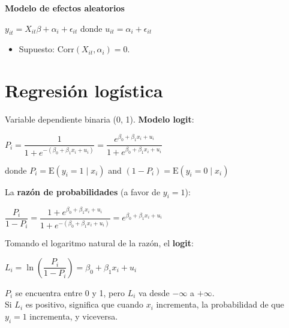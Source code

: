 \documentclass[10pt, a4paper, landscape]{article}
\newcommand{\E}{\mathrm{E}}
\newcommand{\Corr}{\mathrm{Corr}}
\begin{document}
\begin{multicols}{3}
		\textbf{Modelo de efectos aleatorios}
		
		\begin{center}
			$y_{it} = X_{it} \beta + \alpha_{i} + \epsilon_{it}$ donde $u_{it} = \alpha_{i} + \epsilon_{it}$ 
		\end{center}
		
		\begin{itemize}[leftmargin=*]
			\item Supuesto: $\Corr(X_{it}, \alpha_i) = 0$.
		\end{itemize}
		
		\section*{Regresión logística}
		
		Variable dependiente binaria (0, 1). \textbf{Modelo logit}:
		
		\begin{center}
			$P_{i} = \dfrac{1}{1 + e^{-(\beta_{0} + \beta_{1} x_{i} + u_{i})}}= \dfrac{e^{\beta_{0} + \beta_{1} x_{i} + u_{i}}}{1 + e^{\beta_{0} + \beta_{1} x_{i} + u_{i}}}$
		\end{center}
		
		donde $P_{i} = \E(y_{i} = 1 \mid x_{i})$ and $(1 - P_{i}) = \E(y_{i} = 0 \mid x_{i})$
		
		La \textbf{razón de probabilidades} (a favor de $y_{i} = 1$):
		
		\begin{center}
			$\dfrac{P_{i}}{1 - P_{i}} = \dfrac{1 + e^{\beta_{0} + \beta_{1} x_{i} + u_{i}}}{1 + e^{-(\beta_{0} + \beta_{1} x_{i} + u_{i})}} = e^{\beta_{0} + \beta_{1} x_{i} + u_{i}}$
		\end{center}
		
		Tomando el logaritmo natural de la razón, el \textbf{logit}:
		
		\begin{center}
			$L_{i} = \ln \left( \dfrac{P_i}{1 - P_i}\right) = \beta_{0} + \beta_{1} x_{i} + u_{i}$
		\end{center}
		
		\setlength{\multicolsep}{6pt}
		\begin{multicols}{2}
			$P_{i}$ se encuentra entre 0 y 1, pero $L_{i}$ va desde $-\infty$ a $+\infty$. \\
			
			Si $L_{i}$ es positivo, significa que cuando $x_{i}$ incrementa, la probabilidad de que $y_{i} = 1$ incrementa, y viceversa.
			

\end{multicols}
\end{multicols}
\end{document}
